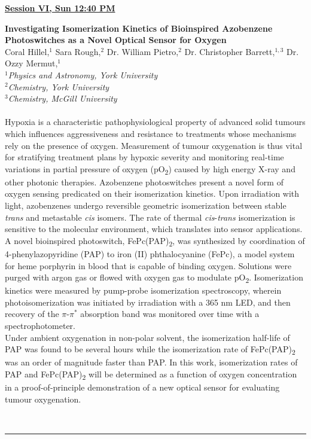 \documentclass[titlepage,oneside,openany,10pt]{book}
\newenvironment{oralabs}[4] %
        {
        \begin{flushright}
                \underline{\textbf{#4}}
        \end{flushright}
        \textbf{#1}\\%
        #2\\%
        \textit{#3}\\\\%
        }
        {
        \\
        \noindent\rule{15cm}{0.5pt}%
        }
\begin{document}
\newpage

\begin{oralabs}
	{Investigating Isomerization Kinetics of Bioinspired Azobenzene Photoswitches as a Novel Optical Sensor for Oxygen}
	{Coral Hillel,$^{1}$ Sara Rough,$^{2}$ Dr. William Pietro,$^{2}$ Dr. Christopher Barrett,$^{1,3}$ Dr. Ozzy Mermut,$^{1}$}
	{
	$^1$Physics and Astronomy, York University\\
	$^2$Chemistry, York University\\
	$^3$Chemistry, McGill University
	}
	{Session VI, Sun 12:40 PM}
	Hypoxia is a characteristic pathophysiological property of advanced solid tumours which influences aggressiveness and resistance to treatments whose mechanisms rely on the presence of oxygen. Measurement of tumour oxygenation is thus vital for stratifying treatment plans by hypoxic severity and monitoring real-time variations in partial pressure of oxygen (pO\textsubscript{2}) caused by high energy X-ray and other photonic therapies. Azobenzene photoswitches present a novel form of oxygen sensing predicated on their isomerization kinetics. Upon irradiation with light, azobenzenes undergo reversible geometric isomerization between stable \emph{trans} and metastable \emph{cis} isomers. The rate of thermal \emph{cis}-\emph{trans} isomerization is sensitive to the molecular environment, which translates into sensor applications.\\A novel bioinspired photoswitch, FePc(PAP)\textsubscript{2}, was synthesized by coordination of 4-phenylazopyridine (PAP) to iron (II) phthalocyanine (FePc), a model system for heme porphyrin in blood that is capable of binding oxygen. Solutions were purged with argon gas or flowed with oxygen gas to modulate pO\textsubscript{2}. Isomerization kinetics were measured by pump-probe isomerization spectroscopy, wherein photoisomerization was initiated by irradiation with a 365 nm LED, and then recovery of the $\pi$-$\pi^{*}$ absorption band was monitored over time with a spectrophotometer.~\\Under ambient oxygenation in non-polar solvent, the isomerization half-life of PAP was found to be several hours while the isomerization rate of FePc(PAP)\textsubscript{2} was an order of magnitude faster than PAP. In this work, isomerization rates of PAP and FePc(PAP)\textsubscript{2} will be determined as a function of oxygen concentration in a proof-of-principle demonstration of a new optical sensor for evaluating tumour oxygenation.
	\label{HillelC}
\end{oralabs}
\end{document}
